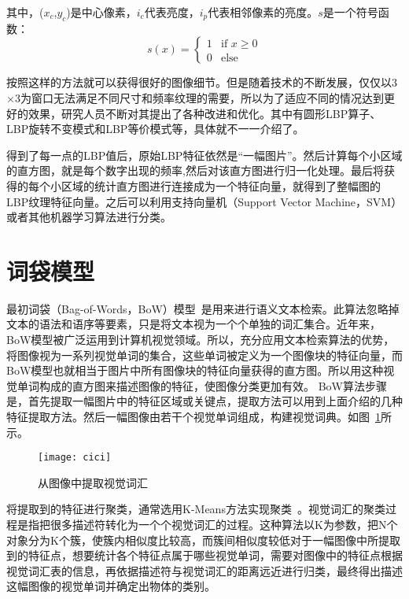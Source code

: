 其中，($x_{c}$,$y_{c}$)是中心像素，$i_{c}$代表亮度，$i_{p}$代表相邻像素的亮度。$s$是一个符号函数：
\begin{equation}
s(x) = \left\{ \begin{array}{ll}
    1 & \textrm{if $x \geq 0$}\\
    0 & \textrm{else}
   \end{array} \right.
\end{equation}  
        
按照这样的方法就可以获得很好的图像细节。但是随着技术的不断发展，仅仅以3$\times$3为窗口无法满足不同尺寸和频率纹理的需要，所以为了适应不同的情况达到更好的效果，研究人员不断对其提出了各种改进和优化。其中有圆形LBP算子、LBP旋转不变模式和LBP等价模式等，具体就不一一介绍了。

得到了每一点的LBP值后，原始LBP特征依然是“一幅图片”。然后计算每个小区域的直方图，就是每个数字出现的频率,然后对该直方图进行归一化处理。最后将获得的每个小区域的统计直方图进行连接成为一个特征向量，就得到了整幅图的LBP纹理特征向量。之后可以利用支持向量机（Support Vector Machine，SVM）或者其他机器学习算法进行分类。
\section{词袋模型}
\label{sec:other}
最初词袋（Bag-of-Words，BoW）模型~\cite{harris1954distributional}是用来进行语义文本检索。此算法忽略掉文本的语法和语序等要素，只是将文本视为一个个单独的词汇集合。近年来，BoW模型被广泛运用到计算机视觉领域。所以，充分应用文本检索算法的优势，将图像视为一系列视觉单词的集合，这些单词被定义为一个图像块的特征向量，而BoW模型也就相当于图片中所有图像块的特征向量获得的直方图。所以用这种视觉单词构成的直方图来描述图像的特征，使图像分类更加有效。
BoW算法步骤是，首先提取一幅图片中的特征区域或关键点，提取方法可以用到上面介绍的几种特征提取方法。然后一幅图像由若干个视觉单词组成，构建视觉词典。如图~\ref{fig:bowtiqu}所示。
\begin{figure}[H] %
\centering
  \texttt{[image: cici]}
  \caption{从图像中提取视觉词汇}
  \label{fig:bowtiqu}
\end{figure}
将提取到的特征进行聚类，通常选用K-Means方法实现聚类~\cite{wagstaff2001constrained}。视觉词汇的聚类过程是指把很多描述符转化为一个个视觉词汇的过程。这种算法以K为参数，把N个对象分为K个簇，使簇内相似度比较高，而簇间相似度较低对于一幅图像中所提取到的特征点，想要统计各个特征点属于哪些视觉单词，需要对图像中的特征点根据视觉词汇表的信息，再依据描述符与视觉词汇的距离远近进行归类，最终得出描述这幅图像的视觉单词并确定出物体的类别。%
